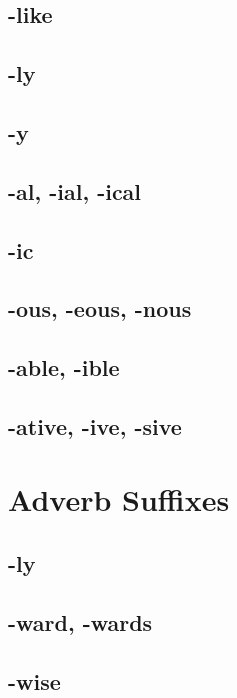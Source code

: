 \subsection{-like}

\subsection{-ly}

\subsection{-y}

\subsection{-al, -ial, -ical}

\subsection{-ic}

\subsection{-ous, -eous, -nous}

\subsection{-able, -ible}

\subsection{-ative, -ive, -sive}

\section{Adverb Suffixes}

\subsection{-ly}

\subsection{-ward, -wards}

\subsection{-wise}

